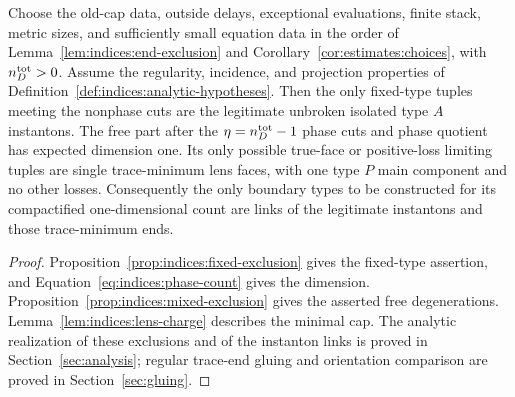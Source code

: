 \begin{theorem}\label{thm:indices:exclusion}
Choose the old-cap data, outside delays, exceptional evaluations, finite
stack, metric sizes, and sufficiently small equation data in the order
of Lemma~\ref{lem:indices:end-exclusion} and
Corollary~\ref{cor:estimates:choices}, with $n_D^{\rm tot}>0$.
Assume the regularity, incidence, and projection properties of
Definition~\ref{def:indices:analytic-hypotheses}.  Then the only fixed-type tuples
meeting the nonphase cuts are the legitimate unbroken isolated type $A$
instantons.  The free part after the $\eta=n_D^{\rm tot}-1$ phase cuts
and phase quotient has expected dimension one.  Its only possible
true-face or positive-loss limiting tuples are single trace-minimum
lens faces, with one type $P$ main component and no other losses.
Consequently the only boundary types to be constructed for its
compactified one-dimensional count are links of the legitimate instantons
and those trace-minimum ends.
\end{theorem}
\begin{proof}
Proposition~\ref{prop:indices:fixed-exclusion} gives the fixed-type
assertion, and Equation~\eqref{eq:indices:phase-count} gives the dimension.
Proposition~\ref{prop:indices:mixed-exclusion} gives the asserted free
degenerations.  Lemma~\ref{lem:indices:lens-charge} describes the minimal
cap.  The analytic realization of these exclusions and of the instanton
links is proved in Section~\ref{sec:analysis}; regular trace-end gluing
and orientation comparison are proved in Section~\ref{sec:gluing}.
\end{proof}
